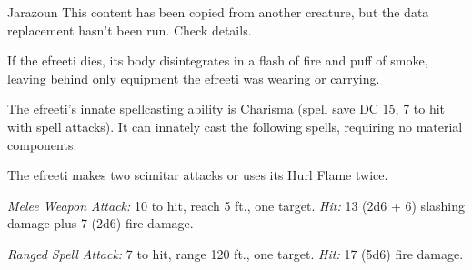 \documentclass[10pt,a4paper,twoside,bg=print,twocolumn,openany,nodeprecatedcode]{dndbook}
\begin{document}
\begin{DndMonster}[float=t]{Jarazoun}
\DndMonsterBasics[
armor-class = {17 (natural armor)},
hit-points = {\DndDice{16d10 + 112}},
speed = {40 ft., fly 60 ft.}
]
\DndMonsterAbilityScores[
 str = 22,
 dex = 12,
 con = 24,
 int = 16,
 wis = 15,
 cha = 16
]
\DndMonsterDetails[
saving-throws = {Int +7, Wis +6, Cha +7},
damage-immunities = {fire},
senses = {darkvision 120 ft., passive perception 12},
languages = {Ignan},
challenge = 11,
]
This content has been copied from another creature, but the data replacement hasn't been run. Check details.

If the efreeti dies, its body disintegrates in a flash of fire and puff of smoke, leaving behind only equipment the efreeti was wearing or carrying.

The efreeti's innate spellcasting ability is Charisma (spell save DC 15, 7 to hit with spell attacks). It can innately cast the following spells, requiring no material components:
\begin{DndMonsterSpells}
\end{DndMonsterSpells}
The efreeti makes two scimitar attacks or uses its Hurl Flame twice.

\textsl{Melee Weapon Attack:} 10 to hit, reach 5 ft., one target. \textsl{Hit:} 13 (2d6 + 6) slashing damage plus 7 (2d6) fire damage.

\textsl{Ranged Spell Attack:} 7 to hit, range 120 ft., one target. \textsl{Hit:} 17 (5d6) fire damage.

\end{DndMonster}
\end{document}
